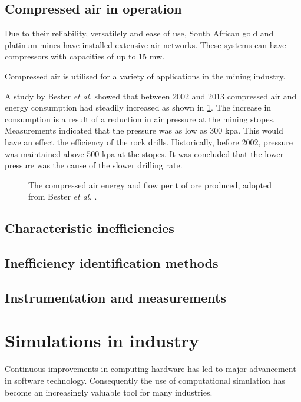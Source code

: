 \subsection{Compressed air in operation}
	Due to their reliability, versatilely and ease of use, South African gold and platinum mines have installed extensive air networks. These systems can have compressors with capacities of up to 15 \gls{mw}\cite{Marais2012PhD}.\par
	Compressed air is utilised for a variety of applications in the mining industry.
	
	A study by  Bester \textit{et al.} showed that between 2002 and 2013 compressed air and energy consumption had steadily increased as shown in \ref{fig: Compressed energy and air flow per ton}. The increase in consumption is a result of a reduction in air pressure at the mining stopes. Measurements indicated that the pressure was as low as 300 \gls{kpa}. This would have an effect the efficiency of the rock drills. Historically, before 2002, pressure was maintained above 500 \gls{kpa} at the stopes.  It was concluded that the lower pressure was the cause of the slower drilling rate.\cite{bester2013effect} \par
	
	\begin{figure}
		\centering
		
		\caption[The compressed air energy and flow per tonne of ore produced.]{The compressed air energy and flow per \gls{t} of ore produced, adopted from Bester \textit{et al.} \cite{bester2013effect}.}
		\label{fig: Compressed energy and air flow per ton}
	\end{figure}

	\subsection{Characteristic inefficiencies}
	\subsection{Inefficiency identification methods}
	\subsection{Instrumentation and measurements}
\section{Simulations in industry}

Continuous improvements in computing hardware has led to major advancement in software technology. Consequently the use of computational simulation has become an increasingly valuable tool for many industries.\cite{kocsis2003integration} \par 


